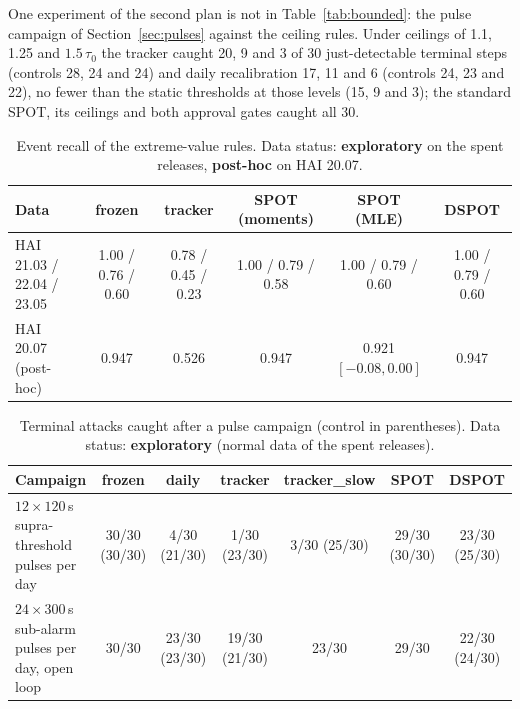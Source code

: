 \documentclass[sigconf,review,anonymous]{acmart}
\begin{document}
One experiment of the second plan is not in Table~\ref{tab:bounded}: the pulse campaign of
Section~\ref{sec:pulses} against the ceiling rules. Under ceilings of 1.1, 1.25 and $1.5\,\tau_0$ the
tracker caught 20, 9 and 3 of 30 just-detectable terminal steps (controls 28, 24 and 24) and daily
recalibration 17, 11 and 6 (controls 24, 23 and 22), no fewer than the static thresholds at those
levels (15, 9 and 3); the standard SPOT, its ceilings and both approval gates caught all 30.

\begin{table}[t]
\caption{Event recall of the extreme-value rules. Data status: \textbf{exploratory} on the spent
releases, \textbf{post-hoc} on HAI 20.07.}
\label{tab:evt}
\begin{tabularx}{\textwidth}{@{}Lccccc@{}}
\toprule
Data & frozen & tracker & SPOT (moments) & SPOT (MLE) & DSPOT \\
\midrule
HAI 21.03 / 22.04 / 23.05 & 1.00 / 0.76 / 0.60 & 0.78 / 0.45 / 0.23 & 1.00 / 0.79 / 0.58 & 1.00 / 0.79 / 0.60 & 1.00 / 0.79 / 0.60 \\
HAI 20.07 (post-hoc) & 0.947 & 0.526 & 0.947 & 0.921 $[-0.08, 0.00]$ & 0.947 \\
\bottomrule
\end{tabularx}
\end{table}

\begin{table}[t]
\caption{Terminal attacks caught after a pulse campaign (control in parentheses). Data status:
\textbf{exploratory} (normal data of the spent releases).}
\label{tab:pulses}
\begin{tabularx}{\textwidth}{@{}Lcccccc@{}}
\toprule
Campaign & frozen & daily & tracker & tracker\_slow & SPOT & DSPOT \\
\midrule
$12 \times 120$\,s supra-threshold pulses per day & 30/30 (30/30) & 4/30 (21/30) & 1/30 (23/30) & 3/30 (25/30) & 29/30 (30/30) & 23/30 (25/30) \\
$24 \times 300$\,s sub-alarm pulses per day, open loop & 30/30 & 23/30 (23/30) & 19/30 (21/30) & 23/30 & 29/30 & 22/30 (24/30) \\
\bottomrule
\end{tabularx}
\end{table}
\end{document}
